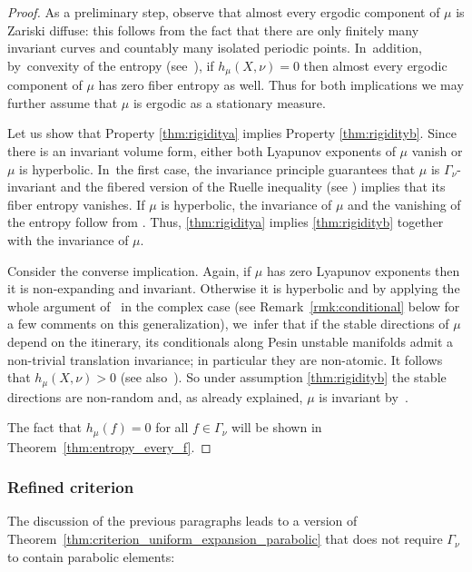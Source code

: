 \begin{proof}
As a preliminary step, observe that almost every ergodic component of $\mu$ is
Zariski diffuse: this follows from the fact that there are
only finitely many invariant curves and countably many isolated periodic points. In~addition, by~convexity
of the entropy (see~\cite[Prop.\,4.3.16]{katok-hasselblatt}), if $h_\mu(X, \nu)=0$ then almost every ergodic component of $\mu$ has zero fiber entropy as well.
Thus for both implications we may further assume that $\mu$ is ergodic as a stationary measure.

Let us show that Property \eqref{thm:rigiditya} implies Property \eqref{thm:rigidityb}. Since there is an invariant volume form, either
both Lyapunov exponents of $\mu$ vanish or $\mu$ is hyperbolic. In~the first case,
the invariance principle guarantees that $\mu$ is $\Gamma_\nu$-invariant and
the fibered version of the Ruelle inequality (see \eg \cite[\S 7]{stiffness}) implies that its fiber entropy
vanishes. If $\mu$ is hyperbolic, the invariance of $\mu$ and the vanishing of the entropy follow from
\cite[Th.\,9.1]{stiffness}.
Thus, \eqref{thm:rigiditya} implies \eqref{thm:rigidityb} together with the invariance of $\mu$.

Consider the converse implication. Again, if $\mu$ has zero Lyapunov exponents then it is non-expanding and
invariant. Otherwise it is hyperbolic and
by applying the whole argument of~\cite{br} in the complex case (see Remark~\ref{rmk:conditional} below for a few comments on this generalization), we~infer that if the stable directions of
$\mu$ depend on the itinerary, its conditionals along Pesin unstable manifolds admit a non-trivial
translation invariance; in particular they are non-atomic. It follows that $h_\mu(X, \nu)>0$
(see also~\cite[Rem.\,9.2]{stiffness}). So under assumption \eqref{thm:rigidityb} the stable directions are non-random and, as
already explained, $\mu$ is invariant by~\cite[Th.\,9.1]{stiffness}.

The fact that $h_\mu(f)=0$ for all $f\in \Gamma_\nu$ will be shown in
Theorem~\ref{thm:entropy_every_f}.
\end{proof}

\subsubsection{Refined criterion}

The discussion of the previous paragraphs leads to a version of
Theorem~\ref{thm:criterion_uniform_expansion_parabolic} that does not require $\Gamma_\nu$ to contain parabolic elements:

